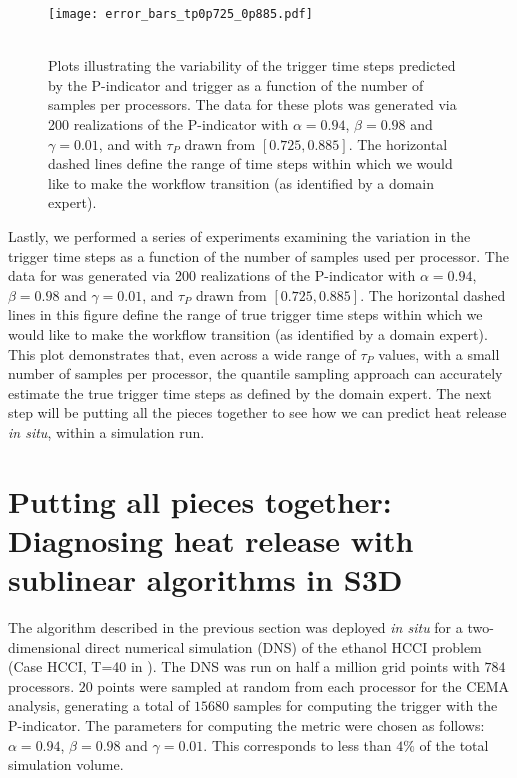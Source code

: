 \documentclass[final]{siamltex}
\newcommand{\pmetric}{P}
\newcommand{\thresh}{\tau}
\begin{document}
\begin{figure}[htpb]
\texttt{[image: error\_bars\_tp0p725\_0p885.pdf]} \\ \\
\caption{\label{fig:Triggers} Plots illustrating the variability of the trigger
time steps 
predicted by the \pmetric-indicator and trigger as a function of the number of
samples per processors.  The data for these plots was generated via 200
realizations of the \pmetric-indicator with $\alpha=0.94$, $\beta=0.98$ and
$\gamma=0.01$, and with $\thresh_{\pmetric}$ drawn from $[0.725, 0.885]$. 
 The horizontal dashed lines define the range of time steps within
which we would like to make the workflow transition (as identified by a domain expert).
}  
\end{figure}

Lastly, we performed a series of experiments examining the variation in the trigger time steps 
as a function of the number of samples used per processor.  The data for
 was generated via 200 realizations of  the \pmetric-indicator with $\alpha=0.94$, $\beta=0.98$ and
$\gamma=0.01$, and $\thresh_{\pmetric}$ drawn from $[0.725, 0.885]$. The
horizontal dashed lines in this figure define the range of true trigger time steps within
which we would like to make the workflow transition (as identified by a domain expert).
This plot demonstrates that, even across a wide range of $\thresh_{\pmetric}$
values,  with a small number of samples per processor, the quantile sampling
approach can accurately estimate the  true trigger time steps as defined by the
domain expert. 
The next step will be  putting all
the pieces  together  to see how we can predict heat release \emph{in situ},
within a simulation run. 

\section{Putting all pieces together: Diagnosing heat release  with sublinear algorithms in S3D}
\label{sec:app}
  
The algorithm described in the previous section was deployed \emph{in situ} for a two-dimensional 
direct numerical simulation (DNS) of the ethanol HCCI problem (Case HCCI, T=40
in ).  
The DNS was run on half a million grid points with $784$ processors. $20$ points
were sampled at random 
from each processor for the CEMA analysis, generating a total of $15680$
samples for computing the trigger with the \pmetric-indicator. 
The parameters for computing the metric were chosen as follows: $\alpha=0.94$, $\beta=0.98$ and $\gamma=0.01$.
This corresponds to less than $4\%$ of the total simulation volume. 
\end{document}
